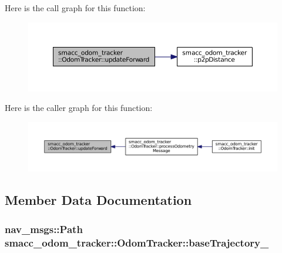 Here is the call graph for this function\+:
\nopagebreak
\begin{figure}[H]
\begin{center}
\leavevmode
\includegraphics[width=350pt]{classsmacc__odom__tracker_1_1OdomTracker_a7ef4ecc171a6fd37b2ed3c96a58e0659_cgraph}
\end{center}
\end{figure}




Here is the caller graph for this function\+:
\nopagebreak
\begin{figure}[H]
\begin{center}
\leavevmode
\includegraphics[width=350pt]{classsmacc__odom__tracker_1_1OdomTracker_a7ef4ecc171a6fd37b2ed3c96a58e0659_icgraph}
\end{center}
\end{figure}




\subsection{Member Data Documentation}
\subsubsection[{\texorpdfstring{base\+Trajectory\+\_\+}{baseTrajectory_}}]{\setlength{\rightskip}{0pt plus 5cm}nav\+\_\+msgs\+::\+Path smacc\+\_\+odom\+\_\+tracker\+::\+Odom\+Tracker\+::base\+Trajectory\+\_\+\hspace{0.3cm}{\ttfamily [protected]}}\hypertarget{classsmacc__odom__tracker_1_1OdomTracker_ac3a17be46ab833632c5f63e75c840dc7}{}\label{classsmacc__odom__tracker_1_1OdomTracker_ac3a17be46ab833632c5f63e75c840dc7}


